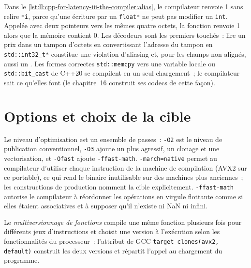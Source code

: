 Dans le \cref{lst:ll:cpp-for-latency-iii-the-compiler:alias}, le compilateur renvoie 1 sans relire \texttt{*i}, parce qu'une
écriture par un \texttt{float*} ne peut pas modifier un \texttt{int}. Appelée avec deux pointeurs vers les mêmes quatre octets, la fonction
renvoie 1 alors que la mémoire contient 0. Les décodeurs sont les premiers touchés~: lire un prix dans un tampon d'octets en convertissant
l'adresse du tampon en \texttt{std::int32\_t*} constitue une violation d'aliasing et, pour les champs non alignés, aussi un . Les formes correctes
\texttt{std::memcpy} vers une variable locale ou \texttt{std::bit\_cast} de C++20 se compilent en un seul chargement~; le compilateur sait
ce qu'elles font (le chapitre~16 construit ses codecs de cette façon).

\section{Options et choix de la cible}

Le niveau d'optimisation est un ensemble de passes~: \texttt{-O2} est le niveau de publication conventionnel, \texttt{-O3} ajoute
un  plus agressif, un clonage et une vectorisation, et \texttt{-Ofast} ajoute \texttt{-ffast-math}. \texttt{-march=native}
permet au compilateur d'utiliser chaque instruction de la machine de compilation (AVX2 sur ce portable), ce qui rend le binaire inutilisable sur des machines plus
anciennes~; les constructions de production nomment la cible explicitement. \texttt{-ffast-math} autorise le compilateur à réordonner
les opérations en virgule flottante comme si elles étaient associatives et à supposer qu'il n'existe ni NaN ni infini.

\begin{definition}\label{def:ll:cpp-for-latency-iii-the-compiler:fmv}
Le \emph{multiversionnage de fonctions} compile une même fonction plusieurs fois pour différents
jeux d'instructions et choisit une version à l'exécution selon les fonctionnalités du processeur~: l'attribut de GCC
\texttt{target\_clones(\textquotedbl{}avx2\textquotedbl{}, \textquotedbl{}default\textquotedbl{})} construit les deux versions et répartit l'appel au chargement du programme.
\end{definition}

